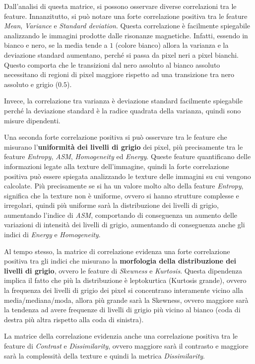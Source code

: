 Dall'analisi di questa matrice, si possono osservare diverse correlazioni tra le
feature. Innanzitutto, si può notare una forte correlazione positiva tra le feature
\textit{Mean}, \textit{Variance} e \textit{Standard deviation}. Questa correlazione
è facilmente spiegabile analizzando le immagini prodotte dalle risonanze magnetiche.
Infatti, essendo in bianco e nero, se la media tende a $1$ (colore bianco) allora
la varianza e la deviazione standard aumentano, perché si passa da pixel neri a 
pixel bianchi. Questo comporta che le transizioni dal nero assoluto al bianco
assoluto necessitano di regioni di pixel maggiore rispetto ad una transizione
tra nero assoluto e grigio ($0.5$).

Invece, la correlazione tra varianza è deviazione standard facilmente spiegabile
perché la deviazione standard è la radice quadrata della varianza, quindi sono
misure dipendenti.

Una seconda forte correlazione positiva si può osservare tra le feature che
misurano l'\textbf{uniformità dei livelli di grigio} dei pixel, più precisamente
tra le feature \textit{Entropy}, \textit{ASM}, \textit{Homogeneity} ed
\textit{Energy}. Queste feature quantificano delle informazioni legate alla
texture dell'immagine, quindi la forte correlazione positiva può essere spiegata
analizzando le texture delle immagini su cui vengono calcolate. Più precisamente
se si ha un valore molto alto della feature \textit{Entropy}, significa che la
texture non è uniforme, ovvero si hanno strutture complesse e irregolari, quindi
più uniforme sarà la distribuzione dei livelli di grigio, aumentando l'indice
di \textit{ASM}, comportando di conseguenza un aumento delle variazioni di intensità
dei livelli di grigio, aumentando di conseguenza anche gli indici di \textit{Energy}
e \textit{Homogeneity}. 

Al tempo stesso, la matrice di correlazione evidenza una forte correlazione positiva
tra gli indici che misurano la \textbf{morfologia della distribuzione dei livelli
      di grigio}, ovvero le feature di \textit{Skewness} e \textit{Kurtosis}.
Questa dipendenza implica il fatto che più la distribuzione è leptokurtica
(Kurtosis grande), ovvero la frequenza dei livelli di grigio dei pixel si
concentrano interamente vicino alla media/mediana/moda, allora più grande sarà
la Skewness, ovvero maggiore sarà la tendenza ad avere frequenze di livelli di
grigio più vicino al bianco (coda di destra più altra rispetto alla coda di
sinistra).

La matrice della correlazione evidenzia anche una correlazione positiva tra le
feature di \textit{Contrast} e \textit{Dissimilarity}, ovvero maggiore sarà il
contrasto e maggiore sarà la complessità della texture e quindi la metrica 
\textit{Dissimilarity}.

